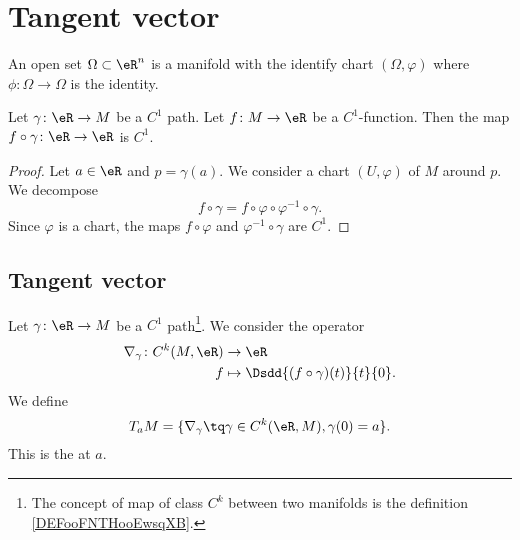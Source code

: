 \section{Tangent vector}


\begin{definition}
    An open set \( \Omega\subset \eR^n\) is a manifold with the identify chart \( (\Omega, \varphi)\) where \( \phi\colon \Omega\to \Omega\) is the identity.
\end{definition}

\begin{lemma}
    Let \( \gamma\colon \eR\to M\) be a \( C^1\) path. Let \( f\colon M\to \eR\) be a \( C^1\)-function. Then the map \( f\circ \gamma\colon \eR\to \eR\) is \( C^1\).   
\end{lemma}

\begin{proof}
    Let \( a\in \eR\) and \( p=\gamma(a)\). We consider a chart \( (U,\varphi)\) of \( M\) around \( p\). We decompose
    \begin{equation}
        f\circ \gamma= f\circ \varphi\circ \varphi^{-1}\circ\gamma.
    \end{equation}
    Since \( \varphi\) is a chart, the maps \( f\circ\varphi\) and \( \varphi^{-1}\circ\gamma\) are \( C^1\).
\end{proof}


\subsection{Tangent vector}

\begin{definition}      \label{DEFooJJVIooDUBwDJ}
    Let \( \gamma\colon \eR\to M\) be a \( C^1\) path\footnote{The concept of map of class \( C^k\) between two manifolds is the definition \ref{DEFooFNTHooEwsqXB}.}. We consider the operator
    \begin{equation}
        \begin{aligned}
            \nabla_{\gamma}\colon C^k(M,\eR)&\to \eR \\
            f&\mapsto \Dsdd{ (f\circ\gamma)(t) }{t}{0}. 
        \end{aligned}
    \end{equation}
    We define
    \begin{equation}
        T_aM=\{ \nabla_{\gamma}\tq \gamma\in C^k(\eR,M),\gamma(0)=a \}.
    \end{equation}
    This is the  at \( a\).
\end{definition}


